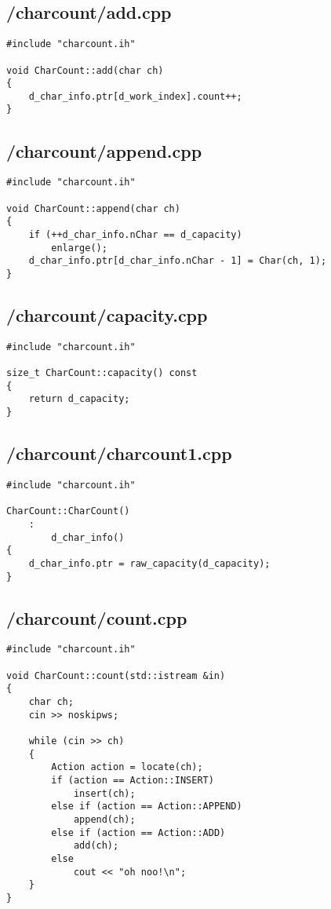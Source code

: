 \documentclass{article}
\begin{document}
\subsection*{/charcount/add.cpp}
\begin{verbatim}
#include "charcount.ih"

void CharCount::add(char ch)
{
    d_char_info.ptr[d_work_index].count++;
}
\end{verbatim}
\subsection*{/charcount/append.cpp}
\begin{verbatim}
#include "charcount.ih"

void CharCount::append(char ch)
{
    if (++d_char_info.nChar == d_capacity)
        enlarge();
    d_char_info.ptr[d_char_info.nChar - 1] = Char(ch, 1);
}

\end{verbatim}
\subsection*{/charcount/capacity.cpp}
\begin{verbatim}
#include "charcount.ih"

size_t CharCount::capacity() const
{
    return d_capacity;
}
\end{verbatim}
\subsection*{/charcount/charcount1.cpp}
\begin{verbatim}
#include "charcount.ih"

CharCount::CharCount()
    :
        d_char_info()
{
    d_char_info.ptr = raw_capacity(d_capacity); 
}
\end{verbatim}
\subsection*{/charcount/count.cpp}
\begin{verbatim}
#include "charcount.ih"

void CharCount::count(std::istream &in)
{
    char ch;
    cin >> noskipws;

    while (cin >> ch)
    {
        Action action = locate(ch);
        if (action == Action::INSERT)
            insert(ch);
        else if (action == Action::APPEND)
            append(ch);
        else if (action == Action::ADD)
            add(ch);
        else
            cout << "oh noo!\n";
    }
}

\end{verbatim}
\end{document}
